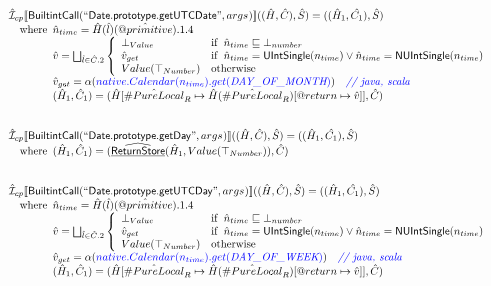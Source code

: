 \documentclass{article}
\makeatletter
\newcommand{\SF}[1]{\mbox{\textsf{#1}}}
\newcommand{\comment}[1]{\textit{#1}}
\newcommand{\wherec}[1]{{\rm where}\begin{array}[t]{l}#1\end{array}}
\newcommand{\ifc}[1]{{\rm if}\begin{array}[t]{l}#1\end{array}}
\newcommand{\owc}{{\rm otherwise}}
\newcommand{\aI}{\hat{\mathcal{I}}}
\newcommand{\lbr}{\llbracket}
\newcommand{\rbr}{\rrbracket}
\newcommand{\ahf}[1]{\widehat{\underline{\sf #1}}}
\newcommand{\varprop}[1]{@#1}
\newcommand{\avarloc}[1]{\hat{\##1}}
\newcommand{\avarprop}[1]{\hat{@#1}}
\def\inblue{\color{blue}}
\def\inblue{\color{blue}}
\makeatother
\begin{document}
\[\begin{array}{l}
\aI _{cp}\lbr \SF{BuiltintCall}(``\SF{Date.prototype.getUTCDate}",args_{})\rbr((\hat{H},\hat{C}), \hat{S})
  = ((\hat{H}_1, \hat{C_1}), \hat{S})\\
\quad\wherec{
  \hat{n}_{time} = \hat{H}(\hat{l})(\avarprop{primitive}).1.4\\
  \hat{v} = \bigsqcup_{\hat{l} \in \hat{C}.2} \left\{\begin{array}{ll}
      \bot_{Value} & \ifc{\hat{n}_{time} \sqsubseteq  \bot_{number}}\\
      \hat{v}_{get} &
      \ifc{\hat{n}_{time} = \SF{UIntSingle}(n_{time}) \lor\hat{n}_{time} = \SF{NUIntSingle}(n_{time}) }\\
      Value(\top_{Number}) & \owc
    \end{array}\right.\\
  \hat{v}_{get} = \alpha({\inblue native.Calendar(n_{time}).get(\emph{DAY\_OF\_MONTH})})
    \quad\comment{{\inblue // java, scala}}\\  
  (\hat{H}_1, \hat{C}_1) = 
    (\hat{H}[\avarloc{PureLocal}_R \mapsto \hat{H}(\avarloc{PureLocal}_R)
      [\varprop{return} \mapsto \hat{v}]], \hat{C})\\
  }\\
\\\\

\aI _{cp}\lbr \SF{BuiltintCall}(``\SF{Date.prototype.getDay}",args_{})\rbr((\hat{H},\hat{C}), \hat{S})
  = ((\hat{H}_1, \hat{C_1}), \hat{S})\\
\quad\wherec{
  (\hat{H}_1, \hat{C}_1) = (\ahf{ReturnStore}(\hat{H}_1, Value(\top_{Number})), \hat{C})
  }\\
\\\\

\aI _{cp}\lbr \SF{BuiltintCall}(``\SF{Date.prototype.getUTCDay}",args_{})\rbr((\hat{H},\hat{C}), \hat{S})
  = ((\hat{H}_1, \hat{C_1}), \hat{S})\\
\quad\wherec{
  \hat{n}_{time} = \hat{H}(\hat{l})(\avarprop{primitive}).1.4\\
  \hat{v} = \bigsqcup_{\hat{l} \in \hat{C}.2} \left\{\begin{array}{ll}
      \bot_{Value} & \ifc{\hat{n}_{time} \sqsubseteq  \bot_{number}}\\
      \hat{v}_{get} &
      \ifc{\hat{n}_{time} = \SF{UIntSingle}(n_{time}) \lor\hat{n}_{time} = \SF{NUIntSingle}(n_{time}) }\\
      Value(\top_{Number}) & \owc
    \end{array}\right.\\
  \hat{v}_{get} = \alpha({\inblue native.Calendar(n_{time}).get(\emph{DAY\_OF\_WEEK})})
    \quad\comment{{\inblue // java, scala}}\\  
  (\hat{H}_1, \hat{C}_1) = 
    (\hat{H}[\avarloc{PureLocal}_R \mapsto \hat{H}(\avarloc{PureLocal}_R)
      [\varprop{return} \mapsto \hat{v}]], \hat{C})\\
  }\\
\\\\

\end{array}
\]
\end{document}
